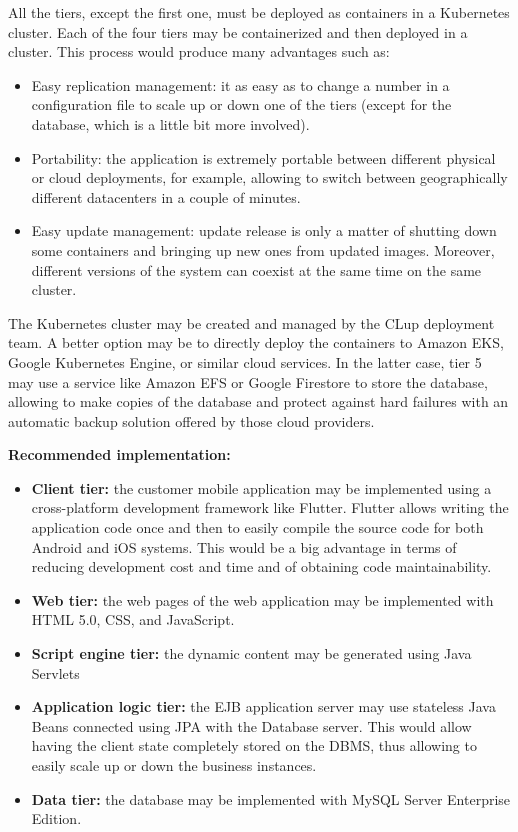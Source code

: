 All the tiers, except the first one, must be deployed as containers in a Kubernetes cluster. Each of the four tiers may be containerized and then deployed in a cluster. This process would produce many advantages such as:
\begin{itemize}
    \item Easy replication management: it as easy as to change a number in a configuration file to scale up or down one of the tiers (except for the database, which is a little bit more involved).
    \item Portability: the application is extremely portable between different physical or cloud deployments, for example, allowing to switch between geographically different datacenters in a couple of minutes.
    \item Easy update management: update release is only a matter of shutting down some containers and bringing up new ones from updated images. Moreover, different versions of the system can coexist at the same time on the same cluster.
\end{itemize}
The Kubernetes cluster may be created and managed by the CLup deployment team. A better option may be to directly deploy the containers to Amazon EKS, Google Kubernetes Engine, or similar cloud services. In the latter case, tier 5 may use a service like Amazon EFS or Google Firestore to store the database, allowing to make copies of the database and protect against hard failures with an automatic backup solution offered by those cloud providers.

\bigbreak
\textbf{Recommended implementation:}
\begin{itemize}
    \item \textbf{Client tier:} the customer mobile application may be implemented using a cross-platform development framework like Flutter. Flutter allows writing the application code once and then to easily compile the source code for both Android and iOS systems. This would be a big advantage in terms of reducing development cost and time and of obtaining code maintainability. 
    \item \textbf{Web tier:} the web pages of the web application may be implemented with HTML 5.0, CSS, and JavaScript. 
    \item \textbf{Script engine tier:} the dynamic content may be generated using Java Servlets
    \item \textbf{Application logic tier:} the EJB application server may use stateless Java Beans connected using JPA with the Database server. This would allow having the client state completely stored on the DBMS, thus allowing to easily scale up or down the business instances.
    \item \textbf{Data tier:} the database may be implemented with MySQL Server Enterprise Edition.
\end{itemize}